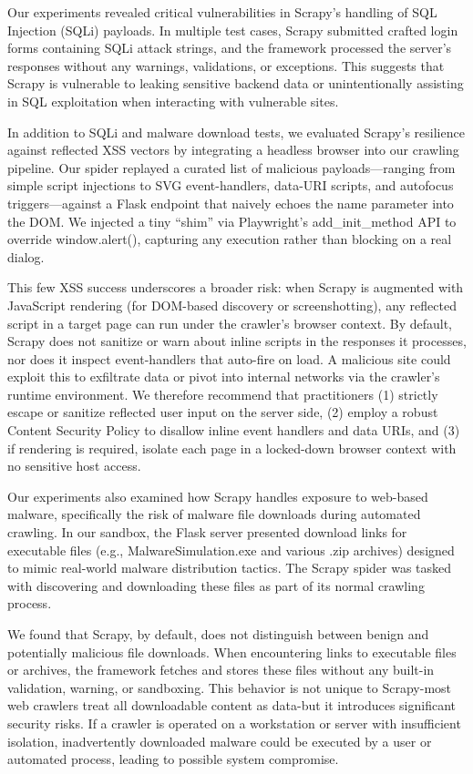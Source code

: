 Our experiments revealed critical vulnerabilities in Scrapy’s handling of SQL Injection (SQLi) payloads. In multiple test cases, Scrapy submitted crafted login forms containing SQLi attack strings, and the framework processed the server's responses without any warnings, validations, or exceptions. This suggests that Scrapy is vulnerable to leaking sensitive backend data or unintentionally assisting in SQL exploitation when interacting with vulnerable sites.

In addition to SQLi and malware download tests, we evaluated Scrapy’s resilience against reflected XSS vectors by integrating a headless browser into our crawling pipeline. Our spider replayed a curated list of malicious payloads—ranging from simple script injections to SVG event-handlers, data-URI scripts, and autofocus triggers—against a Flask endpoint that naively echoes the name parameter into the DOM. We injected a tiny “shim” via Playwright’s add_init_method API to override window.alert(), capturing any execution rather than blocking on a real dialog. 

This few XSS success underscores a broader risk: when Scrapy is augmented with JavaScript rendering (for DOM-based discovery or screenshotting), any reflected script in a target page can run under the crawler’s browser context. By default, Scrapy does not sanitize or warn about inline scripts in the responses it processes, nor does it inspect event-handlers that auto-fire on load. A malicious site could exploit this to exfiltrate data or pivot into internal networks via the crawler’s runtime environment. We therefore recommend that practitioners (1) strictly escape or sanitize reflected user input on the server side, (2) employ a robust Content Security Policy to disallow inline event handlers and data URIs, and (3) if rendering is required, isolate each page in a locked-down browser context with no sensitive host access.

Our experiments also examined how Scrapy handles exposure to web-based malware, specifically the risk of malware file downloads during automated crawling. In our sandbox, the Flask server presented download links for executable files (e.g., MalwareSimulation.exe and various .zip archives) designed to mimic real-world malware distribution tactics. The Scrapy spider was tasked with discovering and downloading these files as part of its normal crawling process.

We found that Scrapy, by default, does not distinguish between benign and potentially malicious file downloads. When encountering links to executable files or archives, the framework fetches and stores these files without any built-in validation, warning, or sandboxing. This behavior is not unique to Scrapy-most web crawlers treat all downloadable content as data-but it introduces significant security risks. If a crawler is operated on a workstation or server with insufficient isolation, inadvertently downloaded malware could be executed by a user or automated process, leading to possible system compromise.

